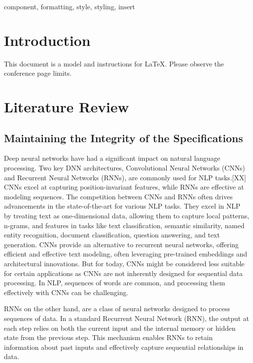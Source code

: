 \documentclass[conference]{IEEEtran}
\begin{document}
\begin{IEEEkeywords}
component, formatting, style, styling, insert
\end{IEEEkeywords}

\section{Introduction}
This document is a model and instructions for \LaTeX.
Please observe the conference page limits. 

\section{Literature Review}

\subsection{Maintaining the Integrity of the Specifications}

Deep neural networks have had a significant impact on natural language processing. Two key DNN architectures, Convolutional Neural Networks (CNNs) and Recurrent Neural Networks (RNNs), are commonly used for NLP tasks.[XX] CNNs excel at capturing position-invariant features, while RNNs are effective at modeling sequences. The competition between CNNs and RNNs often drives advancements in the state-of-the-art for various NLP tasks. They excel in NLP by treating text as one-dimensional data, allowing them to capture local patterns, n-grams, and features in tasks like text classification, semantic similarity, named entity recognition, document classification, question answering, and text generation. CNNs provide an alternative to recurrent neural networks, offering efficient and effective text modeling, often leveraging pre-trained embeddings and architectural innovations. But for today, CNNs might be considered less suitable for certain applications as CNNs are not inherently designed for sequential data processing. In NLP, sequences of words are common, and processing them effectively with CNNs can be challenging.

 RNNs on the other hand,  are a class of neural networks designed to process sequences of data. In a standard Recurrent Neural Network (RNN), the output at each step relies on both the current input and the internal memory or hidden state from the previous step. This mechanism enables RNNs to retain information about past inputs and effectively capture sequential relationships in data. 
\end{document}
